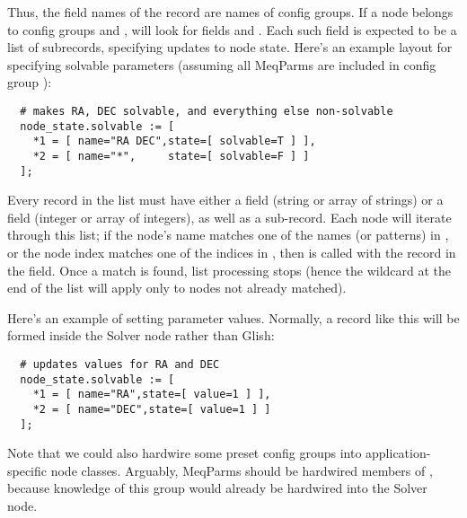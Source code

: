 \documentclass[10pt]{article}
\begin{document}
  Thus, the field names of the  record are names of config
  groups. If a node belongs to config groups  and ,
   will look for fields  and
  . Each such field is expected to be a list of subrecords,
  specifying updates to node state. Here's an example layout for specifying
  solvable parameters (assuming all MeqParms are included in config group
  ):

\begin{verbatim}
  # makes RA, DEC solvable, and everything else non-solvable
  node_state.solvable := [
    *1 = [ name="RA DEC",state=[ solvable=T ] ],
    *2 = [ name="*",     state=[ solvable=F ] ]
  ];
\end{verbatim}

  Every record in the list must have either a  field (string or array
  of strings) or a  field (integer or array of integers), as well
  as a  sub-record. Each node will iterate through this list; if
  the node's name matches one of the names (or patterns) in , or the
  node index matches one of the indices in , then 
  is called with the record in the  field. Once a match is found,
  list processing stops (hence the wildcard at the end of the list will apply 
  only to nodes not already matched).
  
  Here's an example of setting parameter values. Normally, a record like this
  will be formed inside the Solver node rather than Glish:

\begin{verbatim}
  # updates values for RA and DEC
  node_state.solvable := [
    *1 = [ name="RA",state=[ value=1 ] ],
    *2 = [ name="DEC",state=[ value=1 ] ]
  ];
\end{verbatim}  
  
  Note that we could also hardwire some preset config groups into
  application-specific node classes. Arguably, MeqParms should be hardwired
  members of , because knowledge of this group would already be
  hardwired into the Solver node.
\end{document}

